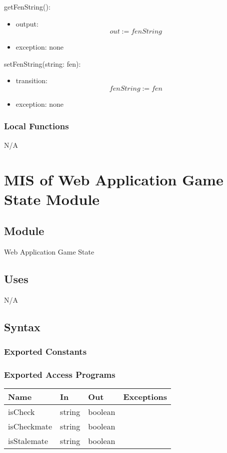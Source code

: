 \documentclass[12pt, titlepage]{article}
\begin{document}
        \noindent getFenString():
        \begin{itemize}
            \item output: \[out := fenString\]
            \item exception: none
        \end{itemize}

        \noindent setFenString(string: fen):
        \begin{itemize}
            \item transition: \[fenString := fen\]
            \item exception: none
        \end{itemize}

    \subsubsection{Local Functions}
    N/A

    \newpage

\section{MIS of Web Application Game State Module} \label{mGame}

    \subsection{Module}
    Web Application Game State

    \subsection{Uses}
    N/A

    \subsection{Syntax}
    \subsubsection{Exported Constants}

    \subsubsection{Exported Access Programs}
        \begin{center}
        \begin{tabular}{p{3.5cm} p{3cm} p{3cm} p{2.5cm}}
        \hline
        \textbf{Name} & \textbf{In} & \textbf{Out} & \textbf{Exceptions} \\
        \hline
        isCheck & string & boolean & \\
        \hline
        isCheckmate & string & boolean & \\
        \hline
        isStalemate & string & boolean & \\
        \hline
        \end{tabular}
        \end{center}
\end{document}
